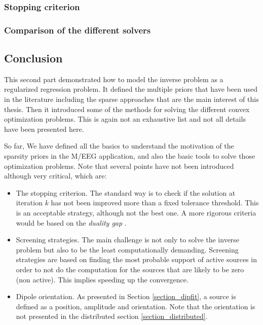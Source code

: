 \subsubsection*{Stopping criterion}

\subsubsection*{Comparison of the different solvers}

\subsection{Conclusion}
This second part demonstrated how to model the inverse problem as a regularized regression problem. It defined the multiple priors that have been used in the literature including the sparse approaches that are the main interest of this thesis. Then it introduced some of the methods for solving the different convex optimization problems. This is again not an exhaustive list and not all details have been presented here. 

So far, We have defined all the basics to understand the motivation of the sparsity priors in the M/EEG application, and also the basic tools to solve those optimization problems. Note that several points have not been introduced although very critical, which are:
\begin{itemize}
	\item The stopping criterion. The standard way is to check if the solution at iteration $k$ has not been improved more than a fixed tolerance threshold. This is an acceptable strategy, although not the best one. A more rigorous criteria would be based on the \textit{duality gap} \cite{boyd2004convex}.
    \item Screening strategies. The main challenge is not only to solve the inverse problem but also to be the least computationally demanding. Screening strategies are based on finding the most probable support of active sources in order to not do the computation for the sources that are likely to be zero (non active). This implies speeding up the convergence.
    \item Dipole orientation. As presented in Section \ref{section_dipfit}, a source is defined as a position, amplitude and orientation. Note that the orientation is not presented in the distributed section \ref{section_distributed}.
\end{itemize}
